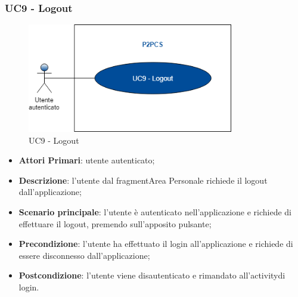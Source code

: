 \subsubsection{UC9 - Logout}
\begin{figure}[h]
	\includegraphics[width=9cm]{res/images/UC9Logout.png}
	\centering
	\caption{UC9 - Logout}
\end{figure}
\begin{itemize}
	\item \textbf{Attori Primari}:
	utente autenticato;
	\item \textbf{Descrizione}: l'utente dal fragment\glosp Area Personale richiede il logout dall'applicazione;
	\item \textbf{Scenario principale}: l'utente è autenticato nell'applicazione e richiede di effettuare il logout, premendo sull'apposito pulsante;
	\item \textbf{Precondizione}: l'utente ha effettuato il login all'applicazione e richiede di essere disconnesso dall'applicazione;
	\item \textbf{Postcondizione}: l'utente viene disautenticato e rimandato all'activity\glosp di login. 
\end{itemize}

